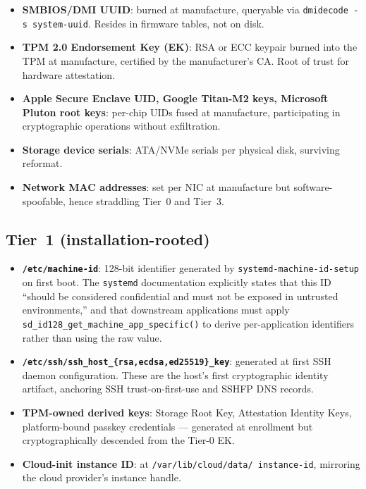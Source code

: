 \documentclass[11pt,a4paper,parskip=half-,DIV=12,headings=standardclasses]{scrartcl}
\theoremstyle{ncthm}
\theoremstyle{ncdef}
\begin{document}
\begin{itemize}
\item \textbf{SMBIOS/DMI UUID}: burned at manufacture, queryable via
  \texttt{dmidecode -s system-uuid}. Resides in firmware tables, not
  on disk.
\item \textbf{TPM 2.0 Endorsement Key (EK)}: RSA or ECC keypair burned
  into the TPM at manufacture, certified by the manufacturer's CA.
  Root of trust for hardware attestation.
\item \textbf{Apple Secure Enclave UID, Google Titan-M2 keys,
  Microsoft Pluton root keys}: per-chip UIDs fused at manufacture,
  participating in cryptographic operations without exfiltration.
\item \textbf{Storage device serials}: ATA/NVMe serials per
  physical disk, surviving reformat.
\item \textbf{Network MAC addresses}: set per NIC at manufacture but
  software-spoofable, hence straddling Tier~0 and Tier~3.
\end{itemize}

\subsection{Tier~1 (installation-rooted)}

\begin{itemize}
\item \textbf{\texttt{/etc/machine-id}}: 128-bit identifier generated
  by \texttt{systemd-machine-id-setup} on first boot. The
  \texttt{systemd} documentation explicitly states that this ID
  ``should be considered confidential and must not be exposed in
  untrusted environments,'' and that downstream applications must
  apply \texttt{sd\_id128\_get\_machine\_app\_specific()} to derive
  per-application identifiers rather than using the raw value.
\item \textbf{\texttt{/etc/ssh/ssh\_host\_\{rsa,ecdsa,ed25519\}\_key}}:
  generated at first SSH daemon configuration. These are the host's
  first cryptographic identity artifact, anchoring SSH
  trust-on-first-use and SSHFP DNS records.
\item \textbf{TPM-owned derived keys}: Storage Root Key, Attestation
  Identity Keys, platform-bound passkey credentials --- generated at
  enrollment but cryptographically descended from the Tier-0 EK.
\item \textbf{Cloud-init instance ID}: at \texttt{/var/lib/cloud/data/
  instance-id}, mirroring the cloud provider's instance handle.
\end{itemize}
\end{document}
